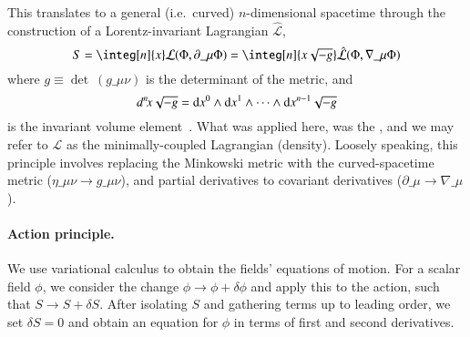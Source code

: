     This translates to a general (i.e.~curved) $n$-dimensional spacetime through the construction of a Lorentz-invariant Lagrangian $\hat{\mathcal{L}}$,
    \begin{equation}
        S = \integ[n]{x}\mathcal{L}(\Phi,  \partial\_{\mu} \Phi) =  \integ[n]{x\sqrt{-g}}\hat{\mathcal{L}}(\Phi,  \nabla\_{\mu} \Phi) 
    \end{equation}
    where $g\equiv \det~\!(g\_{\mu\nu})$ is the determinant of the metric, and 
    \begin{equation}
        d^n \! x \sqrt{-g} =  {\diff x}^0 \wedge {\diff x}^1 \wedge \cdots\wedge  {\diff x}^{n-1}\sqrt{-g}
    \end{equation} 
    is the invariant volume element~\citep{carrollSpacetimeGeometryIntroduction2019}. %
    What was applied here, was the , 
    and we may refer to $\mathcal{L}$ as the minimally-coupled Lagrangian (density). Loosely speaking, this principle involves replacing the Minkowski metric with the curved-spacetime metric ($\eta\_{\mu\nu}\to g\_{\mu\nu}$), and partial derivatives to covariant derivatives ($\partial\_{\mu} \to \nabla\_{\mu} $).
    



    \paragraph{Action principle.} %
    We use variational calculus to obtain the fields' equations of motion. For a scalar field $\phi$, we consider the change $\phi \to \phi + \delta \phi$ and apply this to the action, such that $S\to S+ \delta S$. %
    After isolating $S$ and gathering terms up to leading order, we set $\delta S = 0$ and obtain an equation for $\phi$ in terms of first and second derivatives. 

